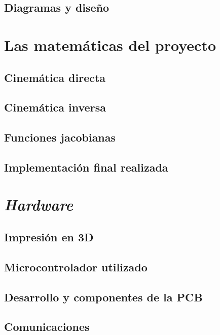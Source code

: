 \section{Diagramas y diseño}


\chapter{Las matemáticas del proyecto}

\section{Cinemática directa}

\section{Cinemática inversa}

\section{Funciones jacobianas}

\section{Implementación final realizada}


\chapter{\textit{Hardware}}

\section{Impresión en 3D}

\section{Microcontrolador utilizado}

\section{Desarrollo y componentes de la PCB}

\section{Comunicaciones}


